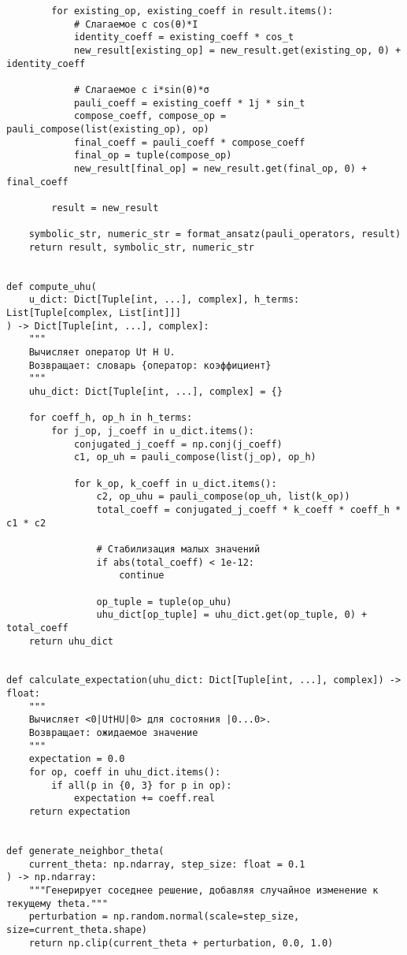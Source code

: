 \documentclass[a4paper]{report}
\begin{document}
\begin{lstlisting}
        for existing_op, existing_coeff in result.items():
            # Слагаемое с cos(θ)*I
            identity_coeff = existing_coeff * cos_t
            new_result[existing_op] = new_result.get(existing_op, 0) + identity_coeff

            # Слагаемое с i*sin(θ)*σ
            pauli_coeff = existing_coeff * 1j * sin_t
            compose_coeff, compose_op = pauli_compose(list(existing_op), op)
            final_coeff = pauli_coeff * compose_coeff
            final_op = tuple(compose_op)
            new_result[final_op] = new_result.get(final_op, 0) + final_coeff

        result = new_result

    symbolic_str, numeric_str = format_ansatz(pauli_operators, result)
    return result, symbolic_str, numeric_str


def compute_uhu(
    u_dict: Dict[Tuple[int, ...], complex], h_terms: List[Tuple[complex, List[int]]]
) -> Dict[Tuple[int, ...], complex]:
    """
    Вычисляет оператор U† H U.
    Возвращает: словарь {оператор: коэффициент}
    """
    uhu_dict: Dict[Tuple[int, ...], complex] = {}

    for coeff_h, op_h in h_terms:
        for j_op, j_coeff in u_dict.items():
            conjugated_j_coeff = np.conj(j_coeff)
            c1, op_uh = pauli_compose(list(j_op), op_h)

            for k_op, k_coeff in u_dict.items():
                c2, op_uhu = pauli_compose(op_uh, list(k_op))
                total_coeff = conjugated_j_coeff * k_coeff * coeff_h * c1 * c2

                # Стабилизация малых значений
                if abs(total_coeff) < 1e-12:
                    continue

                op_tuple = tuple(op_uhu)
                uhu_dict[op_tuple] = uhu_dict.get(op_tuple, 0) + total_coeff
    return uhu_dict


def calculate_expectation(uhu_dict: Dict[Tuple[int, ...], complex]) -> float:
    """
    Вычисляет <0|U†HU|0> для состояния |0...0>.
    Возвращает: ожидаемое значение
    """
    expectation = 0.0
    for op, coeff in uhu_dict.items():
        if all(p in {0, 3} for p in op):
            expectation += coeff.real
    return expectation


def generate_neighbor_theta(
    current_theta: np.ndarray, step_size: float = 0.1
) -> np.ndarray:
    """Генерирует соседнее решение, добавляя случайное изменение к текущему theta."""
    perturbation = np.random.normal(scale=step_size, size=current_theta.shape)
    return np.clip(current_theta + perturbation, 0.0, 1.0)



\end{lstlisting}
\end{document}
